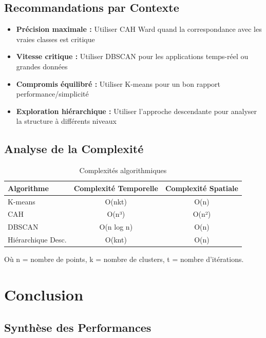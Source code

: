 \documentclass[12pt,a4paper]{article}
\begin{document}
\subsection{Recommandations par Contexte}

\begin{itemize}
    \item \textbf{Précision maximale :} Utiliser CAH Ward quand la correspondance avec les vraies classes est critique
    \item \textbf{Vitesse critique :} Utiliser DBSCAN pour les applications temps-réel ou grandes données
    \item \textbf{Compromis équilibré :} Utiliser K-means pour un bon rapport performance/simplicité
    \item \textbf{Exploration hiérarchique :} Utiliser l'approche descendante pour analyser la structure à différents niveaux
\end{itemize}

\subsection{Analyse de la Complexité}

\begin{table}[H]
\centering
\begin{tabular}{lcc}
\toprule
\textbf{Algorithme} & \textbf{Complexité Temporelle} & \textbf{Complexité Spatiale} \\
\midrule
K-means & O(nkt) & O(n) \\
CAH & O(n³) & O(n²) \\
DBSCAN & O(n log n) & O(n) \\
Hiérarchique Desc. & O(knt) & O(n) \\
\bottomrule
\end{tabular}
\caption{Complexités algorithmiques}
\label{tab:complexity}
\end{table}

Où n = nombre de points, k = nombre de clusters, t = nombre d'itérations.

\section{Conclusion}

\subsection{Synthèse des Performances}
\end{document}
